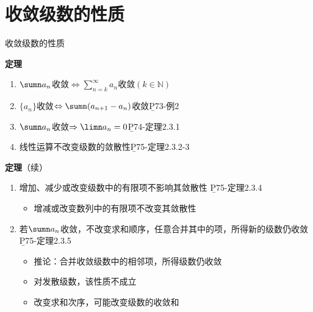 \section{收敛级数的性质}

\begin{frame}{收敛级数的性质}
	\linespread{1.5}\pause 
	\begin{block}{{\bf 定理}\hfill}\pause 
		\begin{enumerate}
		  \item $\sumn
		  a_n$收敛$\Leftrightarrow\sum\limits_{n=k}^{\infty}a_n$收敛$(k\in\mathbb{N})$\pause
		  \item $\{a_n\}$收敛$\Leftrightarrow\sumn(a_{n+1}-a_n)$收敛\hfill {\b
		  P73-例2}\pause 
		  \item $\sumn a_n$收敛$\Rightarrow\limn a_n=0$\hfill {\b P74-定理2.3.1}\pause 
		  \item 线性运算不改变级数的敛散性\hfill {\b P75-定理2.3.2-3}
		\end{enumerate}
	\end{block}
\end{frame}

\begin{frame}
	\linespread{1.5}
	\begin{block}{{\bf 定理}（续）\hfill}
		\begin{enumerate}
		  \addtocounter{enumi}{4}\pause 
		  \item 增加、减少或改变级数中的有限项不影响其敛散性 \hfill {\b P75-定理2.3.4}\pause 
		  \begin{itemize}
		    \item {\alert{增减或改变数列中的有限项不改变其敛散性}}\pause 
		  \end{itemize}
		  \item 若$\sumn a_n$收敛，不改变求和顺序，任意合并其中的项，所得新的级数仍收敛\hfill {\b
		  P75-定理2.3.5}\pause 
		  \begin{itemize}
		    \item 推论：合并收敛级数中的相邻项，所得级数仍收敛\pause 
		    \item {\alert{对发散级数，该性质不成立}}\pause 
		    \item {\alert{改变求和次序，可能改变级数的收敛和}}
		  \end{itemize}
		\end{enumerate}
	\end{block}
\end{frame}

